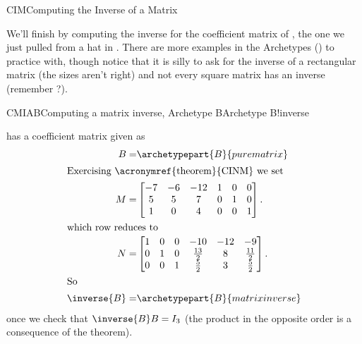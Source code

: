 \begin{subsect}{CIM}{Computing the Inverse of a Matrix}
%
\begin{para}We'll finish by computing the inverse for the coefficient matrix of , the one we just pulled from a hat in .  There are more examples in the Archetypes () to practice with, though notice that it is silly to ask for the inverse of a rectangular matrix (the sizes aren't right) and not every square matrix has an inverse (remember ?).\end{para}
%
\begin{example}{CMIAB}{Computing a matrix inverse, Archetype B}{Archetype B!inverse}
%
\begin{para} has a coefficient matrix given as
%
\begin{align*}
B=&\archetypepart{B}{purematrix}\\
%
\intertext{Exercising \acronymref{theorem}{CINM} we set}
%
M=&
\begin{bmatrix}
-7&-6&-12&1&0&0\\
 5&5&7&0&1&0\\
 1&0&4&0&0&1
\end{bmatrix}.\\
%
\intertext{which row reduces to}
%
N=&
\begin{bmatrix}
1&0&0&-10 & -12 & -9\\
0&1&0&\frac{13}{2} & 8 & \frac{11}{2}\\
0&0&1&\frac{5}{2} & 3 & \frac{5}{2}
\end{bmatrix}.\\
%
\intertext{So}
%
\inverse{B}=&\archetypepart{B}{matrixinverse}
\end{align*}
%
once we check that $\inverse{B}B=I_3$ (the product in the opposite order is a consequence of the theorem).\end{para}
%
\end{example}
%
%
\end{subsect}
%
